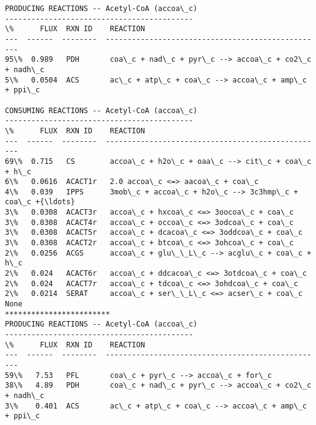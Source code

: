 \documentclass[11pt]{article}
\begin{document}
    \begin{Verbatim}[commandchars=\\\{\}]
PRODUCING REACTIONS -- Acetyl-CoA (accoa\_c)
-------------------------------------------
\%      FLUX  RXN ID    REACTION
---  ------  --------  --------------------------------------------------
95\%  0.989   PDH       coa\_c + nad\_c + pyr\_c --> accoa\_c + co2\_c + nadh\_c
5\%   0.0504  ACS       ac\_c + atp\_c + coa\_c --> accoa\_c + amp\_c + ppi\_c

CONSUMING REACTIONS -- Acetyl-CoA (accoa\_c)
-------------------------------------------
\%      FLUX  RXN ID    REACTION
---  ------  --------  --------------------------------------------------
69\%  0.715   CS        accoa\_c + h2o\_c + oaa\_c --> cit\_c + coa\_c + h\_c
6\%   0.0616  ACACT1r   2.0 accoa\_c <=> aacoa\_c + coa\_c
4\%   0.039   IPPS      3mob\_c + accoa\_c + h2o\_c --> 3c3hmp\_c + coa\_c +{\ldots}
3\%   0.0308  ACACT3r   accoa\_c + hxcoa\_c <=> 3oocoa\_c + coa\_c
3\%   0.0308  ACACT4r   accoa\_c + occoa\_c <=> 3odcoa\_c + coa\_c
3\%   0.0308  ACACT5r   accoa\_c + dcacoa\_c <=> 3oddcoa\_c + coa\_c
3\%   0.0308  ACACT2r   accoa\_c + btcoa\_c <=> 3ohcoa\_c + coa\_c
2\%   0.0256  ACGS      accoa\_c + glu\_\_L\_c --> acglu\_c + coa\_c + h\_c
2\%   0.024   ACACT6r   accoa\_c + ddcacoa\_c <=> 3otdcoa\_c + coa\_c
2\%   0.024   ACACT7r   accoa\_c + tdcoa\_c <=> 3ohdcoa\_c + coa\_c
2\%   0.0214  SERAT     accoa\_c + ser\_\_L\_c <=> acser\_c + coa\_c
None
************************
PRODUCING REACTIONS -- Acetyl-CoA (accoa\_c)
-------------------------------------------
\%      FLUX  RXN ID    REACTION
---  ------  --------  --------------------------------------------------
59\%   7.53   PFL       coa\_c + pyr\_c --> accoa\_c + for\_c
38\%   4.89   PDH       coa\_c + nad\_c + pyr\_c --> accoa\_c + co2\_c + nadh\_c
3\%    0.401  ACS       ac\_c + atp\_c + coa\_c --> accoa\_c + amp\_c + ppi\_c


\end{Verbatim}
\end{document}
